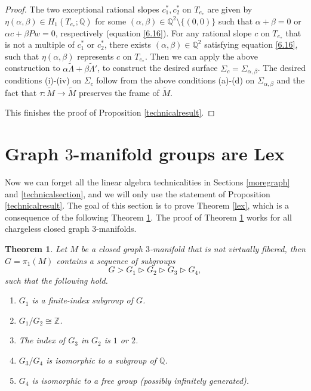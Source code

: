 \documentclass{amsart}
\numberwithin{equation}{section}
\newtheorem{theorem}{Theorem}[section]
\theoremstyle{definition}
\begin{document}
\begin{proof}
The two exceptional rational slopes $c_1^*,c_2^*$ on $T_{e_*}$ are given by $\eta (\alpha,\beta)\in H_1(T_{e_*};\mathbb{Q})$ for some $(\alpha,\beta)\in \mathbb{Q}^2\setminus \{(0,0)\}$ such that $\alpha+\beta=0$ or $\alpha c+\beta Pw=0$, respectively (equation \eqref{6.16}). For any rational slope $c$ on $T_{e_*}$ that is not a multiple of  $c_1^*$ or $c_2^*$, there exists $(\alpha,\beta)\in \mathbb{Q}^2$ satisfying equation \eqref{6.16}, such that $\eta(\alpha,\beta)$ represents $c$ on $T_{e_*}$. Then we can apply the above construction to 
$\alpha\tilde{\Lambda}+\beta\tilde{\Lambda}'$, to construct the desired surface $\Sigma_c=\Sigma_{\alpha,\beta}$. The desired conditions (i)-(iv) on $\Sigma_c$ follow from the above conditions (a)-(d) on $\Sigma_{\alpha,\beta}$ and the fact that $\tau:\tilde{M}\to \tilde{M}$ preserves the frame of $\tilde{M}$.

This finishes the proof of Proposition \ref{technicalresult}.
\end{proof}

\section{Graph $3$-manifold groups are Lex}\label{lexproof}

Now we can forget all the linear algebra technicalities in Sections \ref{moregraph} and \ref{technicalsection}, and we will only use the statement of Proposition \ref{technicalresult}. The goal of this section is to prove Theorem \ref{lex}, which is a consequence of the following Theorem \ref{lexsubgroups}. The proof of Theorem \ref{lexsubgroups} works for all chargeless closed graph $3$-manifolds.


\begin{theorem}\label{lexsubgroups}
Let $M$ be a closed graph $3$-manifold that is not virtually fibered, then $G=\pi_1(M)$ contains a sequence of subgroups 
$$G>G_1\vartriangleright G_2\vartriangleright  G_3\vartriangleright  G_4,$$ such that the following hold.
\begin{enumerate}
\item $G_1$ is a finite-index subgroup of $G$.
\item $G_1/G_2\cong \mathbb{Z}$.
\item The index of $G_3$ in $G_2$ is $1$ or $2$.
\item $G_3/G_4$ is isomorphic to a subgroup of $\mathbb{Q}$.
\item $G_4$ is isomorphic to a free group (possibly infinitely generated).
\end{enumerate}
\end{theorem}
\end{document}
